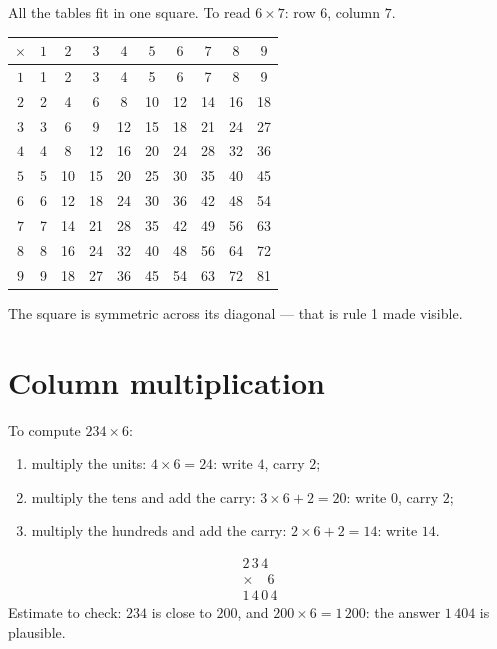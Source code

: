 \begin{example}\label{ex:g3:mult:table}
All the tables fit in one square. To read $6 \times 7$: row $6$,
column $7$.
\begin{center}
\renewcommand{\arraystretch}{1.15}
\begin{tabular}{c|ccccccccc}
$\times$ & $1$ & $2$ & $3$ & $4$ & $5$ & $6$ & $7$ & $8$ & $9$ \\
\hline
$1$ & 1 & 2 & 3 & 4 & 5 & 6 & 7 & 8 & 9 \\
$2$ & 2 & 4 & 6 & 8 & 10 & 12 & 14 & 16 & 18 \\
$3$ & 3 & 6 & 9 & 12 & 15 & 18 & 21 & 24 & 27 \\
$4$ & 4 & 8 & 12 & 16 & 20 & 24 & 28 & 32 & 36 \\
$5$ & 5 & 10 & 15 & 20 & 25 & 30 & 35 & 40 & 45 \\
$6$ & 6 & 12 & 18 & 24 & 30 & 36 & 42 & 48 & 54 \\
$7$ & 7 & 14 & 21 & 28 & 35 & 42 & 49 & 56 & 63 \\
$8$ & 8 & 16 & 24 & 32 & 40 & 48 & 56 & 64 & 72 \\
$9$ & 9 & 18 & 27 & 36 & 45 & 54 & 63 & 72 & 81 \\
\end{tabular}
\end{center}
The square is symmetric across its diagonal --- that is rule 1 made
visible.
\end{example}

\section{Column multiplication}

\begin{method}\label{met:g3:mult:column}
To compute $234 \times 6$:
\begin{enumerate}
  \item multiply the units: $4 \times 6 = 24$: write $4$, carry $2$;
  \item multiply the tens and add the carry:
        $3 \times 6 + 2 = 20$: write $0$, carry $2$;
  \item multiply the hundreds and add the carry:
        $2 \times 6 + 2 = 14$: write $14$.
\end{enumerate}
\[
\begin{array}{r}
2\,3\,4 \\
\times \quad 6 \\
\hline
1\,4\,0\,4
\end{array}
\]
Estimate to check: $234$ is close to $200$, and
$200 \times 6 = 1\,200$: the answer $1\,404$ is plausible.
\end{method}

